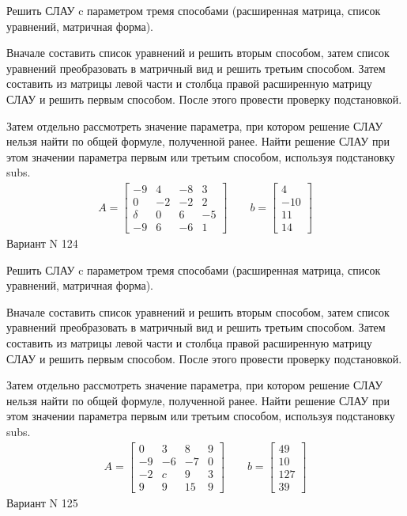 \documentclass[11pt]{report}
\begin{document}
Решить СЛАУ c параметром тремя способами (расширенная матрица, список уравнений, матричная форма).

Вначале составить список уравнений и решить вторым способом,
затем список уравнений преобразовать в матричный вид и решить третьим способом.
Затем составить из матрицы левой части и столбца правой расширенную матрицу СЛАУ и решить первым способом.
После этого провести проверку подстановкой.

Затем отдельно рассмотреть значение параметра, при котором решение СЛАУ нельзя найти по общей формуле,
полученной ранее.
Найти решение СЛАУ при этом значении параметра первым или третьим способом, используя подстановку subs.
\begin{align*}
    A = \left[\begin{matrix}-9 & 4 & -8 & 3\\0 & -2 & -2 & 2\\\delta & 0 & 6 & -5\\-9 & 6 & -6 & 1\end{matrix}\right]
\qquad b = \left[\begin{matrix}4\\-10\\11\\14\end{matrix}\right]
\end{align*}
\newpage
Вариант N 124


Решить СЛАУ c параметром тремя способами (расширенная матрица, список уравнений, матричная форма).

Вначале составить список уравнений и решить вторым способом,
затем список уравнений преобразовать в матричный вид и решить третьим способом.
Затем составить из матрицы левой части и столбца правой расширенную матрицу СЛАУ и решить первым способом.
После этого провести проверку подстановкой.

Затем отдельно рассмотреть значение параметра, при котором решение СЛАУ нельзя найти по общей формуле,
полученной ранее.
Найти решение СЛАУ при этом значении параметра первым или третьим способом, используя подстановку subs.
\begin{align*}
    A = \left[\begin{matrix}0 & 3 & 8 & 9\\-9 & -6 & -7 & 0\\-2 & c & 9 & 3\\9 & 9 & 15 & 9\end{matrix}\right]
\qquad b = \left[\begin{matrix}49\\10\\127\\39\end{matrix}\right]
\end{align*}
\newpage
Вариант N 125
\end{document}
